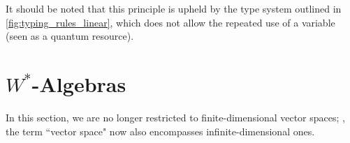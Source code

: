 It should be noted that this principle is upheld by the type system outlined in \autoref{fig:typing_rules_linear}, which does not allow the repeated use of a variable (seen as a quantum resource).






\section{\( W^* \)-Algebras}

In this section, we are no longer restricted to finite-dimensional vector spaces; \ie, the term ``vector space" now also encompasses infinite-dimensional ones. 

